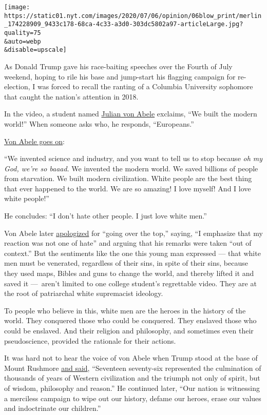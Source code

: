 \texttt{[image: https://static01.nyt.com/images/2020/07/06/opinion/06blow\_print/merlin\_174228909\_9433c178-68ca-4c33-a3d0-303dc5802a97-articleLarge.jpg?quality=75\\\&auto=webp\\\&disable=upscale]}

As Donald Trump gave his race-baiting speeches over the Fourth of July
weekend, hoping to rile his base and jump-start his flagging campaign
for re-election, I was forced to recall the ranting of a Columbia
University sophomore that caught the nation's attention in 2018.

In the video, a student named
\href{https://www.columbiaspectator.com/news/2018/12/10/students-of-color-harassed-outside-butler-by-columbia-sophomore-spewing-racist-white-supremacist-rhetoric/}{Julian
von Abele} exclaims, ``We built the modern world!'' When someone asks
who, he responds, ``Europeans.''

\href{https://www.washingtonpost.com/nation/2018/12/11/were-white-men-we-did-everything-columbia-condemns-students-tirade-targeting-minorities/}{Von
Abele goes on}:

``We invented science and industry, and you want to tell us to stop
because \emph{oh my God, we're so baaad}. We invented the modern world.
We saved billions of people from starvation. We built modern
civilization. White people are the best thing that ever happened to the
world. We are so amazing! I love myself! And I love white people!''

He concludes: ``I don't hate other people. I just love white men.''

Von Abele later
\href{https://www.thedailybeast.com/columbia-student-from-viral-video-speaks-i-am-not-racist}{apologized}
for ``going over the top,'' saying, ``I emphasize that my reaction was
not one of hate'' and arguing that his remarks were taken ``out of
context.'' But the sentiments like the one this young man expressed ---
that white men must be venerated, regardless of their sins, in spite of
their sins, because they used maps, Bibles and guns to change the world,
and thereby lifted it and saved it ---~aren't limited to one college
student's regrettable video. They are at the root of patriarchal white
supremacist ideology.

To people who believe in this, white men are the heroes in the history
of the world. They conquered those who could be conquered. They enslaved
those who could be enslaved. And their religion and philosophy, and
sometimes even their pseudoscience, provided the rationale for their
actions.

It was hard not to hear the voice of von Abele when Trump stood at the
base of Mount Rushmore
\href{https://www.whitehouse.gov/briefings-statements/remarks-president-trump-south-dakotas-2020-mount-rushmore-fireworks-celebration-keystone-south-dakota/}{and
said}, ``Seventeen seventy-six represented the culmination of thousands
of years of Western civilization and the triumph not only of spirit, but
of wisdom, philosophy and reason.'' He continued later, ``Our nation is
witnessing a merciless campaign to wipe out our history, defame our
heroes, erase our values and indoctrinate our children.''

